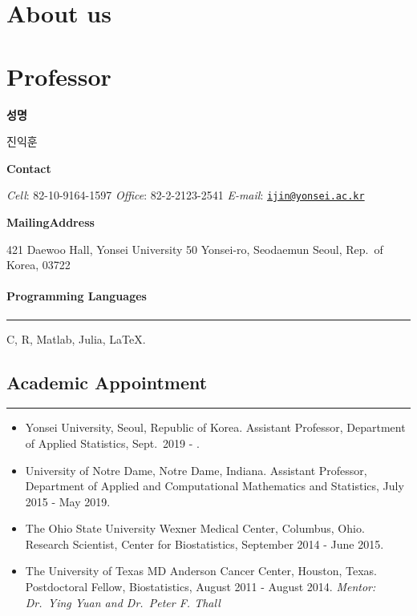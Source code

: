 \documentclass[]{book}
\author{}
\date{\vspace{-2.5em}}
\begin{document}
{
\setcounter{tocdepth}{1}
\tableofcontents
}
\hypertarget{about-us}{%
\chapter*{About us}\label{about-us}}

\hypertarget{professor}{%
\chapter*{Professor}\label{professor}}

\textbf{성명}

진익훈

\textbf{Contact}

\emph{Cell}: 82-10-9164-1597
\emph{Office}: 82-2-2123-2541
\emph{E-mail}: \href{mailto:ijin@yonsei.ac.kr}{\nolinkurl{ijin@yonsei.ac.kr}}

\textbf{Mailing}\textbf{Address}

421 Daewoo Hall, Yonsei University
50 Yonsei-ro, Seodaemun
Seoul, Rep.~of Korea, 03722

\hypertarget{programming-languages}{%
\subsubsection*{Programming Languages}\label{programming-languages}}

\begin{center}\rule{0.5\linewidth}{0.5pt}\end{center}

C, R, Matlab, Julia, LaTeX.

\hypertarget{academic-appointment}{%
\section*{Academic Appointment}\label{academic-appointment}}

\begin{center}\rule{0.5\linewidth}{0.5pt}\end{center}

\begin{itemize}
\item
  Yonsei University, Seoul, Republic of Korea.
  Assistant Professor, Department of Applied Statistics, Sept.~2019 - .
\item
  University of Notre Dame, Notre Dame, Indiana.
  Assistant Professor, Department of Applied and Computational Mathematics and Statistics, July 2015 - May 2019.
\item
  The Ohio State University Wexner Medical Center, Columbus, Ohio.
  Research Scientist, Center for Biostatistics, September 2014 - June 2015.
\item
  The University of Texas MD Anderson Cancer Center, Houston, Texas.
  Postdoctoral Fellow, Biostatistics, August 2011 - August 2014.
  \emph{Mentor: Dr.~Ying Yuan and Dr.~Peter F. Thall}
\end{itemize}
\end{document}

